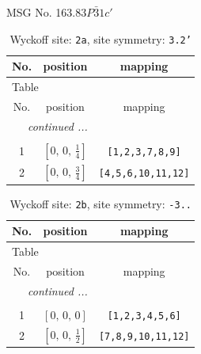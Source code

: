 \documentclass[fleqn,8pt]{jsarticle}
\begin{document}
\setcounter{MaxMatrixCols}{32}

\renewcommand{\tablename}{Table~}
\renewcommand{\figurename}{Figure~}
\begin{center}
\LARGE
MSG No. 163.83\quad$P\bar{3}1c'$
\end{center}
\renewcommand{\arraystretch}{1.2}
\begin{longtable}{ccc}
\caption{Wyckoff site: {\tt 2a}, site symmetry: {\tt 3.2'}}
 \\
 \hline \hline
No. & position & mapping \\ \hline \endfirsthead

\multicolumn{2}{l}{\tablename\ \thetable{}} \\
 \hline \hline
No. & position & mapping \\ \hline \endhead

 \hline \hline
\multicolumn{2}{r}{\footnotesize\it continued ...} \\ \endfoot

 \hline \hline
\multicolumn{2}{r}{} \\ \endlastfoot

1 & $\left[ 0,\, 0,\, \frac{1}{4} \right]$ & {\tt [1,2,3,7,8,9]} \\ \hline
2 & $\left[ 0,\, 0,\, \frac{3}{4} \right]$ & {\tt [4,5,6,10,11,12]} \\
\end{longtable}
\renewcommand{\arraystretch}{1.2}
\begin{longtable}{ccc}
\caption{Wyckoff site: {\tt 2b}, site symmetry: {\tt -3..}}
 \\
 \hline \hline
No. & position & mapping \\ \hline \endfirsthead

\multicolumn{2}{l}{\tablename\ \thetable{}} \\
 \hline \hline
No. & position & mapping \\ \hline \endhead

 \hline \hline
\multicolumn{2}{r}{\footnotesize\it continued ...} \\ \endfoot

 \hline \hline
\multicolumn{2}{r}{} \\ \endlastfoot

1 & $\left[ 0,\, 0,\, 0 \right]$ & {\tt [1,2,3,4,5,6]} \\ \hline
2 & $\left[ 0,\, 0,\, \frac{1}{2} \right]$ & {\tt [7,8,9,10,11,12]} \\
\end{longtable}
\end{document}
